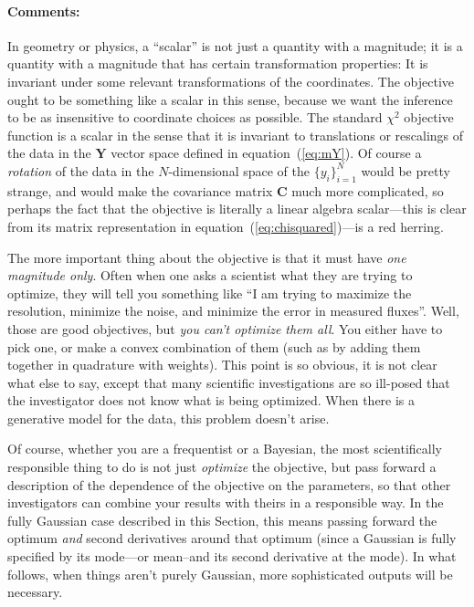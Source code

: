\documentclass[12pt,twoside]{article}
\newcommand{\sectionname}{Section}
\newcommand{\equationname}{equation}
\newcommand{\commentsname}{Comments}
\newcounter{problem}
\newenvironment{comments}{\paragraph{\commentsname:}}{}
\newcommand{\mmatrix}[1]{\boldsymbol{#1}}
\newcommand{\mC}{\mmatrix{C}}
\newcommand{\mY}{\mmatrix{Y}}
\newcommand{\setofall}[3]{\{{#1}\}_{{#2}}^{{#3}}}
\newcommand{\ally}{\setofall{y_i}{i=1}{N}}
\begin{document}
\begin{comments}
In geometry or physics, a ``scalar'' is not just a quantity with a
magnitude; it is a quantity with a magnitude that has certain
transformation properties: It is invariant under some relevant
transformations of the coordinates.  The objective ought to be
something like a scalar in this sense, because we want the inference
to be as insensitive to coordinate choices as possible.  The standard
$\chi^2$ objective function is a scalar in the sense that it is
invariant to translations or rescalings of the data in the $\mY$
vector space defined in \equationname~(\ref{eq:mY}).  Of course a
\emph{rotation} of the data in the $N$-dimensional space of the
$\ally$ would be pretty strange, and would make the covariance matrix
$\mC$ much more complicated, so perhaps the fact that the objective is
literally a linear algebra scalar---this is clear from its matrix
representation in \equationname~(\ref{eq:chisquared})---is a red
herring.

The more important thing about the objective is that it must have
\emph{one magnitude only}.  Often when one asks a scientist what they
are trying to optimize, they will tell you something like ``I am
trying to maximize the resolution, minimize the noise, and minimize
the error in measured fluxes''.  Well, those are good objectives, but
\emph{you can't optimize them all}.  You either have to pick one, or
make a convex combination of them (such as by adding them together in
quadrature with weights).  This point is so obvious, it is not clear
what else to say, except that many scientific investigations are so
ill-posed that the investigator does not know what is being optimized.
When there is a generative model for the data, this problem doesn't
arise.

Of course, whether you are a frequentist or a Bayesian, the most
scientifically responsible thing to do is not just \emph{optimize} the
objective, but pass forward a description of the dependence of the
objective on the parameters, so that other investigators can combine
your results with theirs in a responsible way.  In the fully Gaussian
case described in this \sectionname, this means passing forward the
optimum \emph{and} second derivatives around that optimum (since a
Gaussian is fully specified by its mode---or mean--and its second
derivative at the mode).  In what follows, when things aren't purely
Gaussian, more sophisticated outputs will be necessary.


\end{comments}
\end{document}
